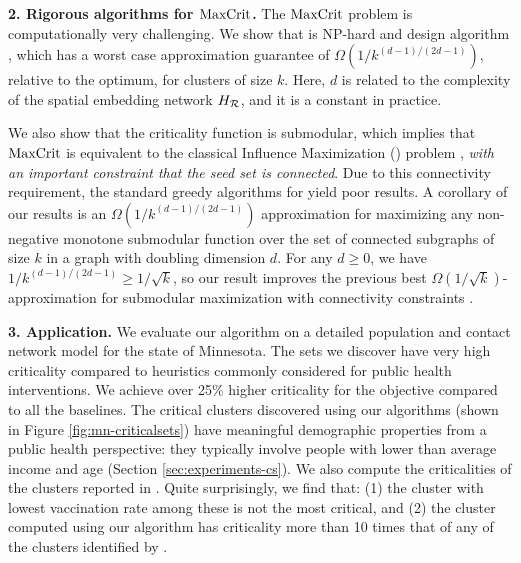 \noindent
\textbf{2. Rigorous algorithms for $\text{MaxCrit}{}$.}
The $\text{MaxCrit}{}$ problem is computationally very challenging. We show that \maxcrit{} is NP-hard and design algorithm \algomaxcrit{}, which has a worst case approximation guarantee of $\Omega(1/k^{(d-1)/(2d-1)})$, relative to the optimum, for clusters of size $k$. Here, $d$ is related to the complexity of the spatial embedding network $H_{\mathcal{R}}$, and it is a constant in practice. 

We also show that the criticality function is submodular, which implies that $\text{MaxCrit}{}$ is equivalent to the classical Influence Maximization (\infmax) problem \cite{kempe:sigkdd03}, \emph{with an important constraint that the seed set is connected}. Due to this connectivity requirement, the standard greedy algorithms for \infmax{} yield poor results. %
A corollary of our results is an $\Omega(1/k^{(d-1)/(2d-1)})$ approximation for maximizing any non-negative monotone submodular function over the set of connected subgraphs of size $k$ in a graph with doubling dimension $d$. For any $d\geq0$, we have $1/k^{(d-1)/(2d-1)}\geq 1/\sqrt{k}$, so our result improves the previous best $\Omega(1/\sqrt{k})$-approximation for submodular maximization with connectivity constraints \cite{kuo2015maximizing}.


\noindent
\textbf{3. Application.} 
We evaluate our algorithm on a detailed population and contact network model for the state of Minnesota.
The sets we discover have very high criticality compared to
heuristics commonly considered for public health interventions.
We achieve over 25\% higher criticality for the objective compared to all the baselines.
The critical clusters discovered using our algorithms (shown in Figure \ref{fig:mn-criticalsets})
have meaningful demographic properties
from a public health perspective: they typically involve people with lower than average
income and age (Section \ref{sec:experiments-cs}).
We also compute the criticalities of the clusters reported in \cite{cadena:vacc-cluster}.
Quite surprisingly, we find that: (1) the cluster with lowest vaccination rate among these is not the most critical, and
(2) the cluster computed using our algorithm has criticality more than 10 times that of any of the clusters
identified by \cite{cadena:vacc-cluster}.



